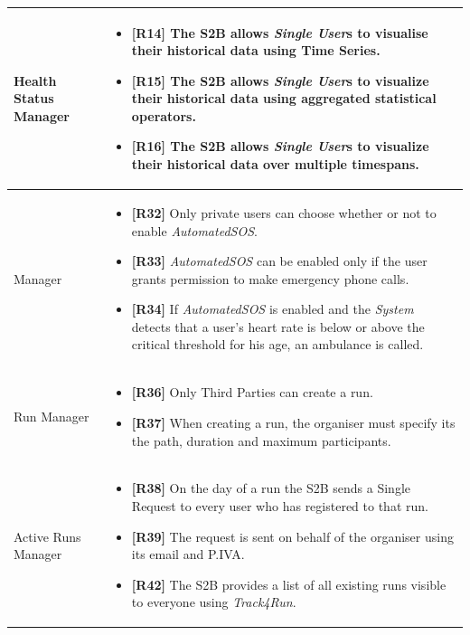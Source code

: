 \documentclass[titlepage]{article}
\begin{document}
\begin{longtable}{| p{5 cm} | p{8 cm} |}
		\\	 \hline	
		\newline Health Status Manager & 
		\begin{itemize}
			\item {\bf [R14]} The S2B allows {\it Single User}s to visualise their historical data using Time Series. 
			\item {\bf [R15]} The S2B allows {\it Single User}s to visualize their historical data using aggregated statistical operators. 
			\item {\bf [R16]} The S2B allows {\it Single User}s to visualize their historical data over multiple timespans.
		\end{itemize}		
		\\	 \hline
		\newline {\it AutomatedSOS} Manager & 
		\begin{itemize}
			\item {\bf [R32]} Only private users can choose whether or not to enable {\it AutomatedSOS}. 
			\item {\bf [R33]} {\it AutomatedSOS} can be enabled only if the user grants permission to make emergency phone calls. 
			\item {\bf [R34]} If {\it AutomatedSOS} is enabled and the {\it System} detects that a user’s heart rate is below or above the critical threshold for his age, an ambulance is called. 
		\end{itemize}		
		\\	 \hline
		\newline Run Manager & 
		\begin{itemize}
			\item {\bf [R36]} Only Third Parties can create a run.
			\item {\bf [R37]} When creating a run, the organiser must specify its the path, duration and maximum participants.
		\end{itemize}		
		\\	 \hline	
		\newline Active Runs Manager & 
		\begin{itemize}
			\item {\bf [R38]} On the day of a run the S2B sends a Single Request to every user who has registered to that run.
			\item {\bf [R39]} The request is sent on behalf of the organiser using its email and P.IVA.
			\item {\bf [R42]} The S2B provides a list of all existing runs visible to everyone using {\it Track4Run}.

\end{itemize}
\end{longtable}
\end{document}
